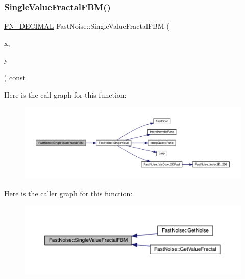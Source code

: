 \subsubsection{\texorpdfstring{Single\+Value\+Fractal\+F\+B\+M()}{SingleValueFractalFBM()}\hspace{0.1cm}{\footnotesize\ttfamily [1/2]}}
{\footnotesize\ttfamily \mbox{\hyperlink{_fast_noise_8h_a75a9ef6d2541c4921815b885bfd449c3}{F\+N\+\_\+\+D\+E\+C\+I\+M\+AL}} Fast\+Noise\+::\+Single\+Value\+Fractal\+F\+BM (\begin{DoxyParamCaption}\item[{\mbox{\hyperlink{_fast_noise_8h_a75a9ef6d2541c4921815b885bfd449c3}{F\+N\+\_\+\+D\+E\+C\+I\+M\+AL}}}]{x,  }\item[{\mbox{\hyperlink{_fast_noise_8h_a75a9ef6d2541c4921815b885bfd449c3}{F\+N\+\_\+\+D\+E\+C\+I\+M\+AL}}}]{y }\end{DoxyParamCaption}) const\hspace{0.3cm}{\ttfamily [private]}}

Here is the call graph for this function\+:
\nopagebreak
\begin{figure}[H]
\begin{center}
\leavevmode
\includegraphics[width=350pt]{d1/dd8/class_fast_noise_a19cdde687bd3d06fa84ea16f52dfe96b_cgraph}
\end{center}
\end{figure}
Here is the caller graph for this function\+:
\nopagebreak
\begin{figure}[H]
\begin{center}
\leavevmode
\includegraphics[width=350pt]{d1/dd8/class_fast_noise_a19cdde687bd3d06fa84ea16f52dfe96b_icgraph}
\end{center}
\end{figure}
\mbox{\label{class_fast_noise_a9189fa5c0fa9d9871290ade57dabe022}} 
